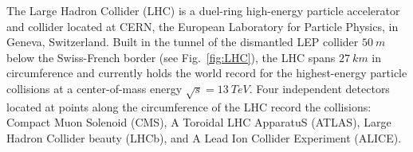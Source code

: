 The Large Hadron Collider (LHC) \cite{LHCTDR} is a duel-ring high-energy particle accelerator and collider located at CERN, the European Laboratory for Particle Physics, in Geneva, Switzerland. Built in the tunnel of the dismantled LEP collider $\SI{50}{m}$ below the Swiss-French border (see Fig.~\ref{fig:LHC}), the LHC spans $\SI{27}{km}$ in circumference and currently holds the world record for the highest-energy particle collisions at a center-of-mass energy $\sqrt{s} = \SI{13}{TeV}$. Four independent detectors located at points along the circumference of the LHC record the collisions: Compact Muon Solenoid (CMS), A Toroidal LHC ApparatuS (ATLAS), Large Hadron Collider beauty (LHCb), and A Lead Ion Collider Experiment (ALICE).

\begin{figure}[H]
    \centering
\end{figure}
